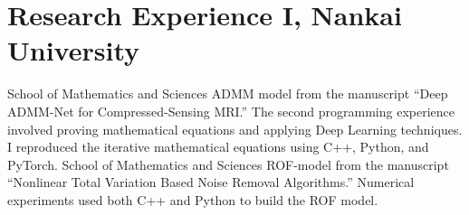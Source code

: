 \documentclass[11pt,a4paper, final]{moderncv}
\newcommand{\spacesection}{\vspace{0.4cm}}
\newcommand{\spacesubsection}{\vspace{0.2cm}}
\begin{document}
\section{\textbf{Research Experience I}, Nankai University}
	{}{}{School of Mathematics and Sciences}
	{ADMM model from the manuscript “Deep ADMM-Net for Compressed-Sensing MRI.”}
	{The second programming experience involved proving mathematical equations and applying Deep Learning techniques. 
	I reproduced the iterative mathematical equations using C++, Python, and PyTorch.}
    \spacesubsection
	{}{}{School of Mathematics and Sciences}
	{ROF-model from the manuscript “Nonlinear Total Variation Based Noise Removal Algorithms.”}
	{Numerical experiments used both C++ and Python to build the ROF model.}
\end{document}
